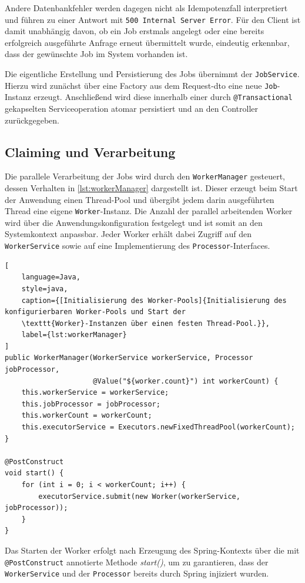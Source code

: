 Andere Datenbankfehler werden dagegen nicht als Idempotenzfall interpretiert und führen zu einer Antwort mit \texttt{500 Internal Server Error}.
Für den Client ist damit unabhängig davon, ob ein Job erstmals angelegt oder eine bereits erfolgreich ausgeführte Anfrage
erneut übermittelt wurde, eindeutig erkennbar, dass der gewünschte Job im System vorhanden ist.

Die eigentliche Erstellung und Persistierung des Jobs übernimmt der \texttt{JobService}.
Hierzu wird zunächst über eine Factory aus dem Request-\gls{dto} eine neue \texttt{Job}-Instanz erzeugt.
Anschließend wird diese innerhalb einer durch \texttt{@Transactional} gekapselten Serviceoperation atomar persistiert
und an den Controller zurückgegeben.

\subsection{Claiming und Verarbeitung}
\label{subsec:impl_verarbeitung}
Die parallele Verarbeitung der Jobs wird durch den \texttt{WorkerManager} gesteuert, dessen Verhalten in \cref{lst:workerManager} dargestellt ist.
Dieser erzeugt beim Start der Anwendung einen Thread-Pool und übergibt jedem darin ausgeführten Thread eine eigene \texttt{Worker}-Instanz.
Die Anzahl der parallel arbeitenden Worker wird über die Anwendungskonfiguration festgelegt und ist somit an den Systemkontext anpassbar.
Jeder Worker erhält dabei Zugriff auf den \texttt{WorkerService} sowie auf eine Implementierung des \texttt{Processor}-Interfaces.

\begin{lstlisting}[
    language=Java,
    style=java,
    caption={[Initialisierung des Worker-Pools]{Initialisierung des konfigurierbaren Worker-Pools und Start der
    \texttt{Worker}-Instanzen über einen festen Thread-Pool.}},
    label={lst:workerManager}
]
public WorkerManager(WorkerService workerService, Processor jobProcessor,
                     @Value("${worker.count}") int workerCount) {
    this.workerService = workerService;
    this.jobProcessor = jobProcessor;
    this.workerCount = workerCount;
    this.executorService = Executors.newFixedThreadPool(workerCount);
}

@PostConstruct
void start() {
    for (int i = 0; i < workerCount; i++) {
        executorService.submit(new Worker(workerService, jobProcessor));
    }
}
\end{lstlisting}

Das Starten der Worker erfolgt nach Erzeugung des Spring-Kontexts über die mit \texttt{@PostConstruct} annotierte Methode
\textit{start()}, um zu garantieren, dass der \texttt{WorkerService} und der \texttt{Processor} bereits durch Spring injiziert wurden.


